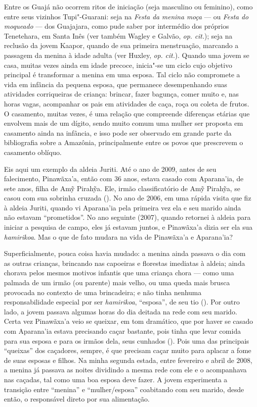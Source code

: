 Entre os Guajá não ocorrem ritos de iniciação (seja masculino ou
feminino), como entre seus vizinhos Tupi"-Guarani: seja na \emph{Festa da
menina moça} --- ou \emph{Festa do moqueado} --- dos Guajajara, como pude
saber por intermédio dos próprios Tenetehara, em Santa Inês (ver também
Wagley e Galvão, \emph{op. cit.}); seja na reclusão da jovem Kaapor, quando de
sua primeira menstruação, marcando a passagem da menina à idade adulta
(ver Huxley, \emph{op. cit.}). Quando uma jovem se casa, muitas vezes ainda em
idade precoce, inicia"-se um ciclo cujo objetivo principal é transformar
a menina em uma esposa. Tal ciclo não compromete a vida em infância da
pequena esposa, que permanece desempenhando suas atividades corriqueiras
de criança: brincar, fazer bagunça, comer muito e, nas horas vagas,
acompanhar os pais em atividades de caça, roça ou coleta de frutos. O
casamento, muitas vezes, é uma relação que compreende diferenças etárias
que envolvem mais de um dígito, sendo muito comum uma mulher ser
proposta em casamento ainda na infância, e isso pode ser observado em
grande parte da bibliografia sobre a Amazônia, principalmente entre os
povos que prescrevem o casamento oblíquo.

Eis aqui um exemplo da aldeia Juriti. Até o ano de 2009, antes de seu
falecimento, Pinawãxa'a, então com 36 anos, estava casado com
Aparana'ia, de sete anos, filha de Amỹ Pirahỹa. Ele, irmão
classificatório de Amỹ Pirahỹa, se casou com sua sobrinha cruzada ().
No ano de 2006, em uma rápida visita que fiz à aldeia Juriti, quando vi
Aparana'ia pela primeira vez ela e seu marido ainda não estavam
``prometidos''. No ano seguinte (2007), quando retornei à aldeia para
iniciar a pesquisa de campo, eles já estavam juntos, e Pinawãxa'a dizia
ser ela sua \emph{hamirikoa}. Mas o que de fato mudara na vida de
Pinawãxa'a e Aparana'ia?

Superficialmente, pouca coisa havia mudado: a menina ainda passava o dia
com as outras crianças, brincando nas capoeiras e florestas imediatas à
aldeia; ainda chorava pelos mesmos motivos infantis que uma criança
chora --- como uma palmada de um irmão (ou parente) mais velho, ou uma
queda mais brusca provocada no contexto de uma brincadeira; e não tinha
nenhuma responsabilidade especial por ser \emph{hamirikoa}, ``esposa'', de
seu tio (). Por outro lado, a jovem passava algumas horas do dia
deitada na rede com seu marido. Certa vez Pinawãxa'a veio se queixar, em
tom dramático, que por haver se casado com Aparana'ia estava precisando
caçar bastante, pois tinha que levar comida para sua esposa e para os
irmãos dela, seus cunhados (). Pois uma das principais ``queixas'' dos
caçadores, sempre, é que precisam caçar muito para aplacar a fome de
suas esposas e filhos. Na minha segunda estada, entre fevereiro e abril
de 2008, a menina já passava as noites dividindo a mesma rede com ele e
o acompanhava nas caçadas, tal como uma boa esposa deve fazer. A jovem
experimenta a transição entre ``menina'' e ``mulher/esposa'' coabitando
com seu marido, desde então, o responsável direto por sua alimentação.

